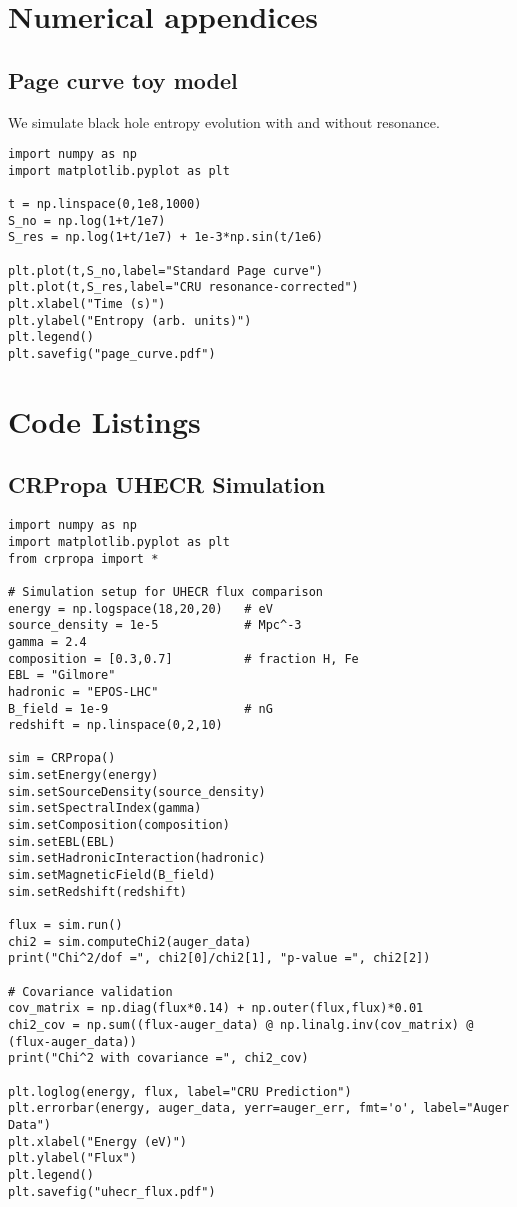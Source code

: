\documentclass[%
 reprint,
 amsmath,amssymb,
 aps,
 pra,
 longbibliography,
 nofootinbib
]{revtex4-2}
\begin{document}
\chapter{Numerical appendices}
\section{Page curve toy model}
We simulate black hole entropy evolution with and without resonance.

\begin{verbatim}
import numpy as np
import matplotlib.pyplot as plt

t = np.linspace(0,1e8,1000)
S_no = np.log(1+t/1e7)
S_res = np.log(1+t/1e7) + 1e-3*np.sin(t/1e6)

plt.plot(t,S_no,label="Standard Page curve")
plt.plot(t,S_res,label="CRU resonance-corrected")
plt.xlabel("Time (s)")
plt.ylabel("Entropy (arb. units)")
plt.legend()
plt.savefig("page_curve.pdf")
\end{verbatim}
\chapter{Code Listings}
\section{CRPropa UHECR Simulation}
\begin{verbatim}
import numpy as np
import matplotlib.pyplot as plt
from crpropa import *

# Simulation setup for UHECR flux comparison
energy = np.logspace(18,20,20)   # eV
source_density = 1e-5            # Mpc^-3
gamma = 2.4
composition = [0.3,0.7]          # fraction H, Fe
EBL = "Gilmore"
hadronic = "EPOS-LHC"
B_field = 1e-9                   # nG
redshift = np.linspace(0,2,10)

sim = CRPropa()
sim.setEnergy(energy)
sim.setSourceDensity(source_density)
sim.setSpectralIndex(gamma)
sim.setComposition(composition)
sim.setEBL(EBL)
sim.setHadronicInteraction(hadronic)
sim.setMagneticField(B_field)
sim.setRedshift(redshift)

flux = sim.run()
chi2 = sim.computeChi2(auger_data)
print("Chi^2/dof =", chi2[0]/chi2[1], "p-value =", chi2[2])

# Covariance validation
cov_matrix = np.diag(flux*0.14) + np.outer(flux,flux)*0.01
chi2_cov = np.sum((flux-auger_data) @ np.linalg.inv(cov_matrix) @ (flux-auger_data))
print("Chi^2 with covariance =", chi2_cov)

plt.loglog(energy, flux, label="CRU Prediction")
plt.errorbar(energy, auger_data, yerr=auger_err, fmt='o', label="Auger Data")
plt.xlabel("Energy (eV)")
plt.ylabel("Flux")
plt.legend()
plt.savefig("uhecr_flux.pdf")
\end{verbatim}
\end{document}
